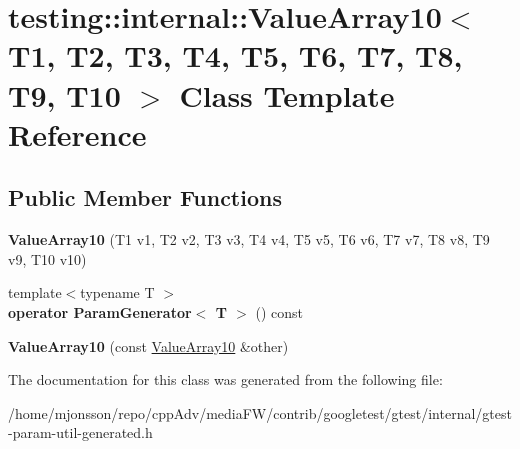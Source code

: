 \hypertarget{classtesting_1_1internal_1_1ValueArray10}{}\section{testing\+:\+:internal\+:\+:Value\+Array10$<$ T1, T2, T3, T4, T5, T6, T7, T8, T9, T10 $>$ Class Template Reference}
\label{classtesting_1_1internal_1_1ValueArray10}
\subsection*{Public Member Functions}
\begin{DoxyCompactItemize}
\item 
\mbox{\label{classtesting_1_1internal_1_1ValueArray10_a763527165bcd1d8e7c366f979b76736b}} 
{\bfseries Value\+Array10} (T1 v1, T2 v2, T3 v3, T4 v4, T5 v5, T6 v6, T7 v7, T8 v8, T9 v9, T10 v10)
\item 
\mbox{\label{classtesting_1_1internal_1_1ValueArray10_afa8855c713997ae82781159f3a3d53fc}} 
{\footnotesize template$<$typename T $>$ }\\{\bfseries operator Param\+Generator$<$ T $>$} () const
\item 
\mbox{\label{classtesting_1_1internal_1_1ValueArray10_a05195c20e50321e51b2502c71c5ec8fa}} 
{\bfseries Value\+Array10} (const \hyperlink{classtesting_1_1internal_1_1ValueArray10}{Value\+Array10} \&other)
\end{DoxyCompactItemize}


The documentation for this class was generated from the following file\+:\begin{DoxyCompactItemize}
\item 
/home/mjonsson/repo/cpp\+Adv/media\+F\+W/contrib/googletest/gtest/internal/gtest-\/param-\/util-\/generated.\+h\end{DoxyCompactItemize}
